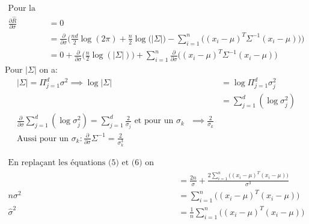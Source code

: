 \documentclass{article}
\begin{document}
\begin{enumerate}[label=(\alph*)]
  \begin{align*}
    \text{Pour la variance ou l'écart-type:}\\
    \frac{\partial\hat{R}}{\partial \sigma}
    &= 0 \\
                                            &=
                                              \frac{\partial}{\partial
                                              \sigma}\Bigg(
                                              \frac{nd}{2}\log{{(2 \pi)+
                                              \frac{n}{2}\log(|\Sigma}|)
                                              }-
                                              \sum_{i=1}^{n}\Big(
                                              (x_i - \mu)^T\Sigma^{-1}(x_i-\mu)
                                              \Big)                                            
                                              \Bigg)\\
                                            &= 0 + \frac{\partial}{\partial \sigma}\big(\frac{n}{2}\log(|\Sigma|)\big) +
                                              \sum_{i=1}^{n} \frac{\partial}{\partial
                                              \sigma}\Big(
                                              (x_i - \mu)^T\Sigma^{-1}(x_i-\mu)
                                              \Big)
  \end{align*}
  Pour $|\Sigma|$ on a:
  \begin{align}
|\Sigma| = \Pi_{j=1}^{d}\sigma^2 \implies \log|\Sigma| &=
                                                         \log\Pi_{j=1}^{d}\sigma_j^2 \\
                                                       &=
                            \sum_{j=1}^d(\log\sigma_j^2)
    \\
               \frac{\partial}{\partial
    \sigma}\sum_{j=1}^d(\log\sigma_j^2) = \sum_{j=1}^d\frac{2}{\sigma_j}
    \text{ et pour un $\sigma_k$ } \implies \frac{2}{\sigma_k} \\
    \text{Aussi pour un $\sigma_k$}:
    \frac{\partial}{\partial \sigma}\Sigma^{-1} = \frac{2}{\sigma_k^3}
  \end{align}
  
  \begin{align*}
    \text{En replaçant les équations (5) et (6) on aura:}\\
                                            & = \frac{2n}{\sigma}
                                              + \frac{2\sum_{i=1}^{n}
                                              \big((x_i - \mu)^T(x_i-\mu)
                                              \big)}{\sigma^3}\\
n\sigma^2 &= \sum_{i=1}^{n}
                                              \big((x_i - \mu)^T(x_i-\mu)
             \big)\\
\hat{\sigma}^2 &= \frac{1}{n}\sum_{i=1}^{n}
                                              \big((x_i - \mu)^T(x_i-\mu)\big)
  \end{align*}
  
\end{enumerate}
\end{document}
